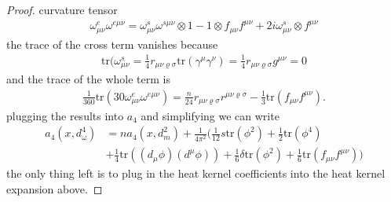 \begin{proof}
     curvature tensor
     \begin{align}
         \omega_{\mu\nu}^e\omega^{e\mu\nu} = \omega_{\mu\nu}^s\omega^{s\mu\nu}
         \otimes 1 - 1\otimes f_{\mu\nu}f^{\mu\nu} + 2i\omega_{\mu\nu}^s
         \otimes f^{\mu\nu}
     \end{align}
     the trace  of the cross term vanishes because
     \begin{align}
         \text{tr}(\omega^{s}_{\mu\nu} = \frac{1}{4}
         r_{\mu\nu\varrho\sigma}\text{tr}(\gamma^\mu\gamma^\nu) = \frac{1}{4}
         r_{\mu\nu\varrho\sigma}g^{\mu\nu} =0
     \end{align}
     and the trace of the whole term is
     \begin{align}
         \frac{1}{360}\text{tr}(30\omega^e_{\mu\nu}\omega^{e\mu\nu}) =
         \frac{n}{24}r_{\mu\nu\varrho\sigma}r^{\mu\nu\varrho\sigma}
         -\frac{1}{3}\text{tr}(f_{\mu\nu}f^{\mu\nu}).
     \end{align}
     plugging the results into $a_4$ and simplifying we can write
     \begin{align}
         a_4(x, d_\omega^4) &= na_4(x, d_m^2) + \frac{1}{4\pi^2}\bigg(\frac{1}{12} s
         \text{tr}(\phi^2) + \frac{1}{2}\text{tr}(\phi^4) \\
         &+ \frac{1}{4}
         \text{tr}((d_\mu\phi)(d^\mu \phi)) + \frac{1}{6}
         \delta\text{tr}(\phi^2) + \frac{1}{6}
         \text{tr}(f_{\mu\nu}f^{\mu\nu})\bigg)
     \end{align}
     the only thing left is to plug in the heat kernel coefficients into the
     heat kernel expansion above.
\end{proof}


